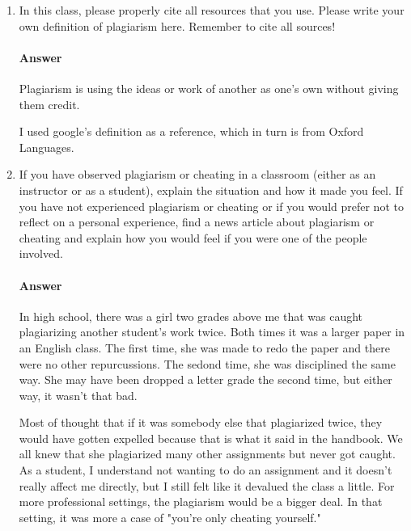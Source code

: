 \documentclass{article}
\begin{document}
\collab{}

\begin{enumerate}

      \item In this class, please properly cite all resources that you use. Please
            write your own definition of plagiarism here.  Remember to cite all
            sources!
            
            \paragraph{Answer}
            Plagiarism is using the ideas or work of another as one's own without giving them credit.
            
            I used google's definition as a reference, which in turn is from Oxford Languages.
            
      \item If you have observed plagiarism or cheating in a classroom (either as
            an instructor or as a student), explain the situation and how it made
            you feel.  If you have not experienced plagiarism or cheating or if you
            would prefer not to reflect on a personal experience, find a news
            article about plagiarism or cheating and explain how you would feel if
            you were one of the people involved.
            
            \paragraph{Answer}
            In high school, there was a girl two grades above me that was caught plagiarizing
            another student's work twice. Both times it was a larger paper in an English class.
            The first time, she was made to redo the paper and there were no other repurcussions.
            The sedond time, she was disciplined the same way. She may have been dropped a letter grade
            the second time, but either way, it wasn't that bad. 
            
            Most of thought that if it was somebody else that plagiarized twice, they would have gotten expelled
            because that is what it said in the handbook. We all knew that she plagiarized many other assignments
            but never got caught. As a student, I understand not wanting to do an assignment and it doesn't really
            affect me directly, but I still felt like it devalued the class a little. For more professional settings,
            the plagiarism would be a bigger deal. In that setting, it was more a case of "you're only cheating yourself."
            
            
\end{enumerate}
\end{document}
